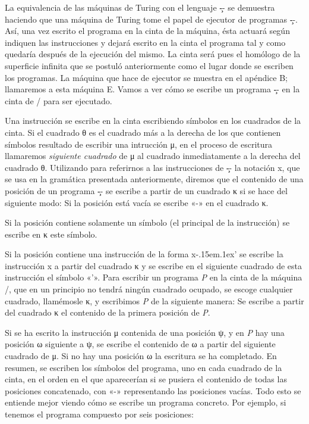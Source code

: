 La equivalencia de las máquinas de Turing con el lenguaje \c-- se demuestra haciendo que una máquina
de Turing tome el papel de ejecutor de programas \c--. Así, una vez escrito el programa en la cinta
de la máquina, ésta actuará según indiquen las instrucciones y dejará escrito en la cinta el
programa tal y como quedaría después de la ejecución del mismo. La cinta será pues el homólogo de la
superficie infinita que se postuló anteriormente como el lugar donde se escriben los programas. La
máquina que hace de ejecutor se muestra en el apéndice B; llamaremos a esta máquina {\machine
E}. Vamos a ver cómo se escribe un programa \c-- en la cinta de \E/ para ser ejecutado.

Una instrucción se escribe en la cinta escribiendo símbolos en los cuadrados de la cinta. Si el
cuadrado θ es el cuadrado más a la derecha de los que contienen símbolos resultado de escribir una
intrucción μ, en el proceso de escritura llamaremos {\it siguiente cuadrado} de μ al cuadrado
inmediatamente a la derecha del cuadrado θ. Utilizando para referirnos a las instrucciones de \c--
la notación {\fgramatnoterm x}, que se usa en la gramática presentada
anteriormente, diremos que el contenido de una posición de un programa \c-- se escribe a partir de
un cuadrado κ si se hace del siguiente modo:
\listanormal
Si la posición está vacía se escribe «-» en el cuadrado κ.\par
Si la posición contiene solamente un símbolo (el principal de la instrucción) se escribe en κ
este símbolo.\par
Si la posición contiene una instrucción de la forma {\fgramatnoterm x\fcode\kern-.15em\lower.1ex\hbox{’}} se escribe la instrucción {\fgramatnoterm x} a partir del cuadrado κ y se escribe en el siguiente cuadrado de esta
instrucción el símbolo «{\fcode ’}».
\finlista
Para escribir un programa {\it P} en la cinta de la máquina \E/, que en un principio no tendrá
ningún cuadrado ocupado, se escoge cualquier cuadrado, llamémosle κ, y escribimos
{\it P} de la siguiente manera:
\listanormal
Se escribe a partir del cuadrado κ el contenido de la primera posición de {\it P}.\par Si se ha
escrito la instrucción μ contenida de una posición ψ, y en {\it P} hay una posición ω siguiente a ψ,
se escribe el contenido de ω a partir del siguiente cuadrado de μ. Si no hay una posición ω
la escritura se ha completado.
\finlista
En resumen, se escriben los símbolos del programa, uno en cada cuadrado de la cinta, en el orden en
el que aparecerían si se pusiera el contenido de todas las posiciones concatenado, con «-»
representando las posiciones vacías. Todo esto se entiende mejor viendo cómo se escribe un programa
concreto. Por ejemplo, si tenemos el programa compuesto por seis posiciones:

